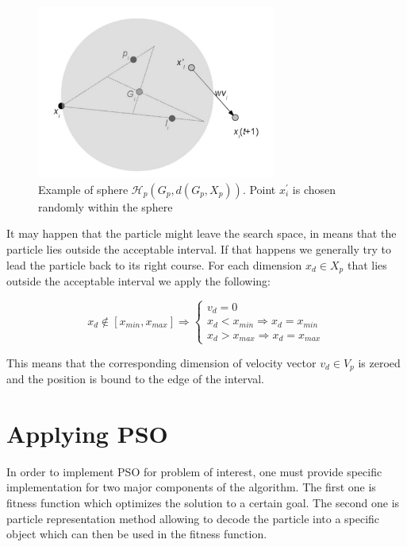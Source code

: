 \documentclass{mini}
\begin{document}
\begin{figure}[H]
    \includegraphics[width=0.7\textwidth]{./images/pso_sphere.png}
    \caption{Example of sphere  $\mathcal{H}_p(G_p, d(G_p, X_p))$. Point $x^{'}_{i}$ is chosen randomly within the sphere}
    \label{fig:pso_sphere}
\end{figure}

It may happen that the particle might leave the search space, in means that the particle lies outside the acceptable interval. If that happens we generally try to lead the particle back to its right course. For each dimension $x_{d} \in X_p$ that lies  outside the acceptable interval we apply the following:

\[
x_{d} \notin [x_{min}, x_{max}] \Rightarrow \left \{
\begin{array}{ll}
v_{d} = 0 \\
x_d < x_{min} \Rightarrow x_d = x_{min} \\
x_d > x_{max} \Rightarrow x_d = x_{max}
\end{array}
\right.
\]

This means that the corresponding dimension of velocity vector $v_d \in V_p$ is zeroed and the position is bound to the edge of the interval.

\section{Applying PSO}
In order to implement PSO for problem of interest, one must provide specific implementation for two major components of the algorithm. The first one is fitness function which optimizes the solution to a certain goal. The second one is particle representation method allowing to decode the particle into a specific object which can then be used in the fitness function.


\end{document}
